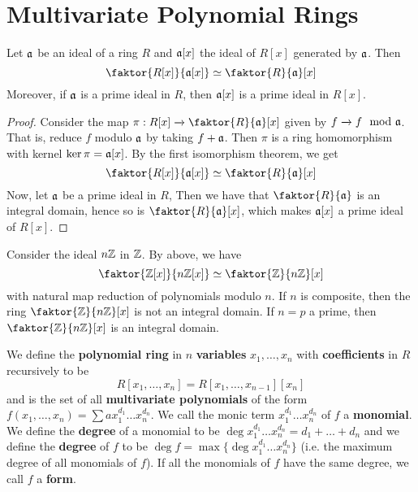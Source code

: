 \section{Multivariate Polynomial Rings}
\label{section_7.1}

\begin{theorem}\label{theorem_7.1.1}
  Let $\mathfrak{a}$ be an ideal of a ring $R$ and $\mathfrak{a}[x]$ the ideal of $R[x]$ generated by
  $\mathfrak{a}$. Then
  \begin{equation*}
    \faktor{R[x]}{\af[x]} \simeq \faktor{R}{\af}[x]
  \end{equation*}
  Moreover, if $\mathfrak{a}$ is a prime ideal in $R$, then $\mathfrak{a}[x]$ is a prime ideal in
  $R[x]$.
\end{theorem}
\begin{proof}
  Consider the map $\pi:R[x] \xrightarrow{} \faktor{R}{\af}[x]$ given by $f
  \xrightarrow{} f \mod{\mathfrak{a}}$. That is, reduce $f$ modulo $\mathfrak{a}$ by
  taking $f+\mathfrak{a}$. Then $\pi$ is a ring homomorphism with kernel
  $\ker{\pi}=\mathfrak{a}[x]$. By the first isomorphism theorem, we get
  \begin{equation*}
    \faktor{R[x]}{\af[x]} \simeq \faktor{R}{\af}[x]
  \end{equation*}
  Now, let $\mathfrak{a}$ be a prime ideal in $R$, Then we have that
  $\faktor{R}{\af}$ is an integral domain, hence so is $\faktor{R}{\af}[x]$,
  which makes $\mathfrak{a}[x]$ a prime ideal of $R[x]$.
\end{proof}

\begin{example}\label{example_7.1}
  Consider the ideal $n\mathbb{Z}$ in  $\mathbb{Z}$. By above, we have
  \begin{equation*}
    \faktor{\Z[x]}{n\Z[x]} \simeq \faktor{\Z}{n\Z}[x]
  \end{equation*}
  with natural map reduction of polynomials modulo $n$. If $n$ is composite,
  then the ring $\faktor{\Z}{n\Z}[x]$ is not an integral domain. If $n=p$ a
  prime, then  $\faktor{\Z}{n\Z}[x]$ is an integral domain.
\end{example}

\begin{definition}
  We define the \textbf{polynomial ring} in $n$  \textbf{variables} $x_1,
  \dots, x_n$ with \textbf{coefficients} in $R$ recursively to be
  \begin{equation*}
    R[x_1, \dots, x_n]=R[x_1, \dots, x_{n-1}][x_n]
  \end{equation*}
  and is the set of all \textbf{multivariate polynomials} of the form $f(x_1,
  \dots,x_n)=\sum{ax_1^{d_1} \dots x_n^{d_n}}$. We call the monic term
  $x_1^{d_1} \dots x_n^{d_n}$ of $f$ a  \textbf{monomial}. We define the
  \textbf{degree} of a monomial to be $\deg{x_1^{d_1} \dots
  x_n^{d_n}}=d_1+\dots+d_n$ and we define the \textbf{degree} of $f$ to be
  $\deg{f}=\max{\{\deg{x_1^{d_1} \dots x_n^{d_n}}\}}$ (i.e. the maximum degree
  of all monomials of $f$). If all the monomials of $f$ have the same degree,
  we call  $f$ a \textbf{form}.
\end{definition}

